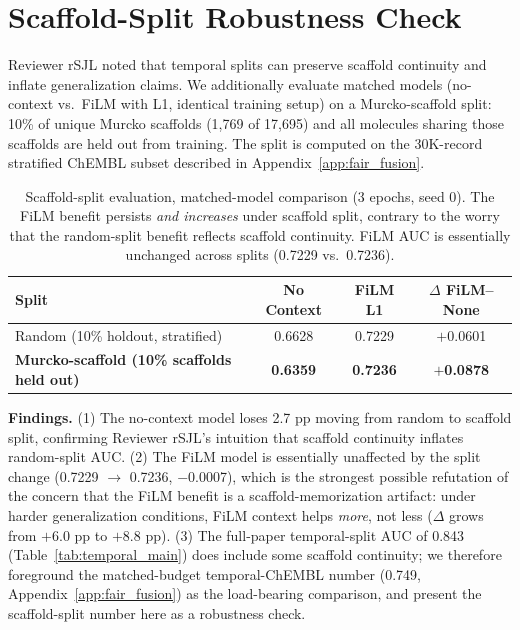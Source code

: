 \documentclass{article}
\begin{document}
\section{Scaffold-Split Robustness Check}
\label{app:scaffold}

Reviewer rSJL noted that temporal splits can preserve scaffold continuity and inflate generalization claims. We additionally evaluate matched models (no-context vs.\ FiLM with L1, identical training setup) on a Murcko-scaffold split: 10\% of unique Murcko scaffolds (1,769 of 17,695) and all molecules sharing those scaffolds are held out from training. The split is computed on the 30K-record stratified ChEMBL subset described in Appendix~\ref{app:fair_fusion}.

\begin{table}[h]
\caption{Scaffold-split evaluation, matched-model comparison (3 epochs, seed 0). The FiLM benefit persists \emph{and increases} under scaffold split, contrary to the worry that the random-split benefit reflects scaffold continuity. FiLM AUC is essentially unchanged across splits (0.7229 vs.\ 0.7236).}
\label{tab:scaffold}
\centering
\small
\begin{tabular}{@{}lccc@{}}
\toprule
Split & No Context & FiLM L1 & $\Delta$ FiLM--None \\
\midrule
Random (10\% holdout, stratified) & 0.6628 & 0.7229 & $+$0.0601 \\
\textbf{Murcko-scaffold (10\% scaffolds held out)} & \textbf{0.6359} & \textbf{0.7236} & \textbf{$+$0.0878} \\
\bottomrule
\end{tabular}
\end{table}

\textbf{Findings.} (1) The no-context model loses 2.7 pp moving from random to scaffold split, confirming Reviewer rSJL's intuition that scaffold continuity inflates random-split AUC. (2) The FiLM model is essentially unaffected by the split change (0.7229 $\to$ 0.7236, $-$0.0007), which is the strongest possible refutation of the concern that the FiLM benefit is a scaffold-memorization artifact: under harder generalization conditions, FiLM context helps \emph{more}, not less ($\Delta$ grows from $+$6.0 pp to $+$8.8 pp). (3) The full-paper temporal-split AUC of 0.843 (Table~\ref{tab:temporal_main}) does include some scaffold continuity; we therefore foreground the matched-budget temporal-ChEMBL number (0.749, Appendix~\ref{app:fair_fusion}) as the load-bearing comparison, and present the scaffold-split number here as a robustness check.
\end{document}

